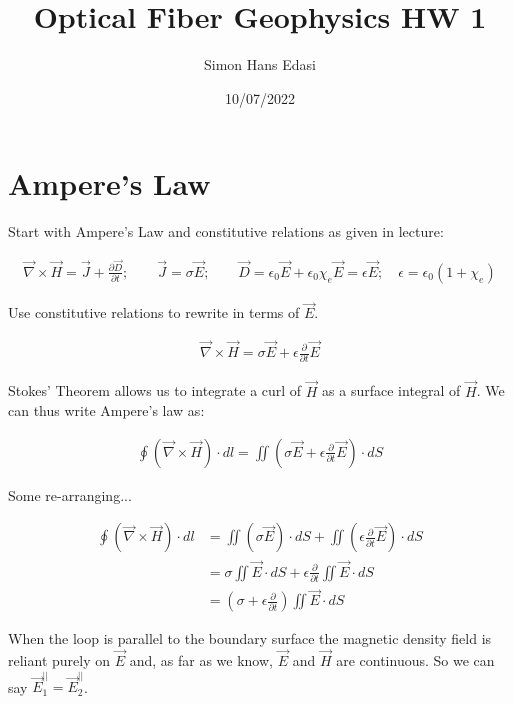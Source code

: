 \documentclass{article}
\title{Optical Fiber Geophysics HW 1}
\date{10/07/2022}
\author{Simon Hans Edasi}
\begin{document}
	\maketitle
	
	
\section{Ampere's Law}

Start with Ampere's Law and constitutive relations as given in lecture:

\begin{align}
\vec{\nabla} \times \vec{H} = \vec{J} + \frac{\partial \vec{D}} {\partial t};
\qquad
\vec{J} = \sigma \vec{E};
\qquad
\vec{D} = \epsilon_{0} \vec{E} + \epsilon_{0} \chi_{e} \vec{E} = \epsilon \vec{E}; \quad \epsilon = \epsilon_{0}(1+\chi_{e})
\end{align}


Use constitutive relations to rewrite in terms of $\vec{E}$.

\begin{align}
\vec{\nabla} \times \vec{H} = \sigma \vec{E} + \epsilon \frac{\partial}{\partial t} \vec{E}
\end{align}



Stokes' Theorem allows us to integrate a curl of $\vec{H}$ as a surface integral of $\vec{H}$. We can thus write Ampere's law as:


\begin{align}
\oint \left( \vec{\nabla} \times \vec{H} \right) \cdot dl = \iint \left( \sigma \vec{E} + \epsilon \frac{\partial}{\partial t} \vec{E} \right) \cdot dS
\end{align}


Some re-arranging...

\begin{align}
\oint \left( \vec{\nabla} \times \vec{H} \right) \cdot dl &= \iint \left( \sigma \vec{E} \right) \cdot dS + \iint \left( \epsilon \frac{\partial}{\partial t} \vec{E} \right) \cdot dS \\
	&= \sigma \iint \vec{E} \cdot dS + \epsilon \frac{\partial}{\partial t} \iint \vec{E}  \cdot dS \\
	&= \left(\sigma + \epsilon \frac{\partial}{\partial t} \right) \iint \vec{E} \cdot dS
\end{align}



When the loop is parallel to the boundary surface the magnetic density field is reliant purely on $\vec{E}$ and, as far as we know, $\vec{E}$ and $\vec{H}$ are continuous. So we can say $\vec{E}_{1}^{||} = \vec{E}_{2}^{||}$.
\end{document}
